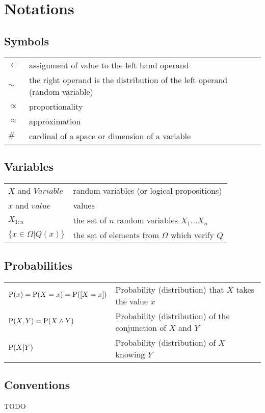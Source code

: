 \chapter*{Notations}

\section*{Symbols}
\begin{tabular}{ll}
$\leftarrow$ & assignment of value to the left hand operand \\
$\sim$ & the right operand is the distribution of the left operand (random variable) \\
$\propto$ & proportionality \\
$\approx$ & approximation \\
$\#$ & cardinal of a space or dimension of a variable \\
\end{tabular}

\section*{Variables}
\begin{tabular}{ll}
$X$ and $Variable$ & random variables (or logical propositions) \\
$x$ and $value$ & values \\
$X_{1:n}$ & the set of $n$ random variables $X_1 \dots X_n$ \\
$\{x \in \Omega | Q(x)\}$ & the set of elements from $\Omega$ which verify $Q$ \\
\end{tabular}

\section*{Probabilities}

\begin{tabular}{ll}
$\mathrm{P}(x) = \mathrm{P}(X=x) = \mathrm{P}([X=x])$ & Probability (distribution) that $X$ takes the value $x$ \\
$\mathrm{P}(X,Y) = \mathrm{P}(X\wedge Y)$ & Probability (distribution) of the conjunction of $X$ and $Y$ \\
$\mathrm{P}(X|Y)$ & Probability (distribution) of $X$ knowing $Y$ \\
\end{tabular}

\section*{Conventions}
TODO
